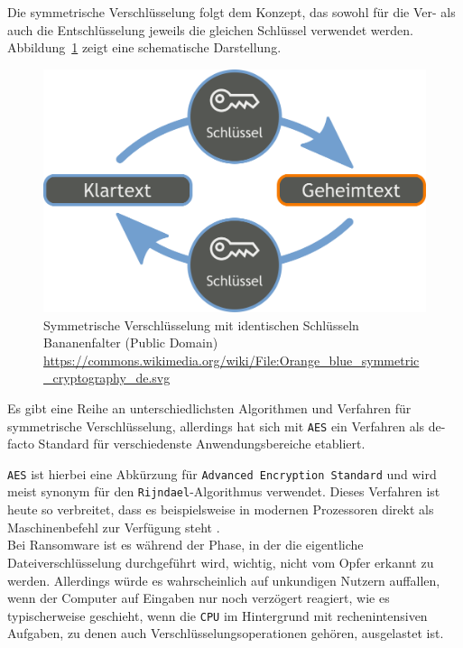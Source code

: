 \label{sec:sym_verschl}

Die symmetrische Verschlüsselung folgt dem Konzept, das sowohl für die Ver- als auch die Entschlüsselung jeweils die gleichen Schlüssel verwendet werden. \\
Abbildung~\ref{fig:sym_verschl} zeigt eine schematische Darstellung.

\begin{figure}[h!]
	\centering
	\includegraphics[scale=0.22]{img/SymKrypto.png}
	\caption{Symmetrische Verschlüsselung mit identischen Schlüsseln \\
	Bananenfalter (Public Domain) \\ \url{https://commons.wikimedia.org/wiki/File:Orange_blue_symmetric_cryptography_de.svg}
	}
	\label{fig:sym_verschl}
\end{figure}

Es gibt eine Reihe an unterschiedlichsten Algorithmen und Verfahren für symmetrische Verschlüsselung, allerdings hat sich mit \texttt{AES} ein Verfahren als de-facto Standard für verschiedenste Anwendungsbereiche etabliert.

\texttt{AES} ist hierbei eine Abkürzung für \texttt{Advanced Encryption Standard} und wird meist synonym für den \texttt{Rijndael}-Algorithmus verwendet. Dieses Verfahren ist heute so verbreitet, dass es beispielsweise in modernen Prozessoren direkt als Maschinenbefehl zur Verfügung steht \cite{crypto:aes_intel}. 
\\

Bei Ransomware ist es während der Phase, in der die eigentliche Dateiverschlüsselung durchgeführt wird, wichtig, nicht vom Opfer erkannt zu werden. Allerdings würde es wahrscheinlich auf unkundigen Nutzern auffallen, wenn der Computer auf Eingaben nur noch verzögert reagiert, wie es typischerweise geschieht, wenn die \texttt{CPU} im Hintergrund mit rechenintensiven Aufgaben, zu denen auch Verschlüsselungsoperationen gehören, ausgelastet ist.

